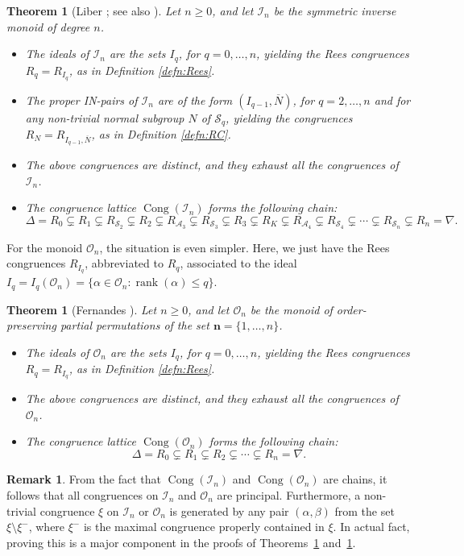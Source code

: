 \documentclass[11pt,a4paper]{article}
\renewcommand{\O}{\mathcal O}
\newcommand{\I}{\mathcal I}
\renewcommand{\S}{\mathcal S}
\newcommand{\A}{\mathcal A}
\newcommand{\bn}{\mathbf{n}}
\newcommand{\al}{\alpha}
\newcommand{\Cong}{\operatorname{Cong}}
\newcommand{\rank}{\operatorname{rank}}
\newcommand{\set}[2]{\{ {#1} : {#2} \}}
\newcommand{\1}{\id_n}
\newcommand{\suq}{\subsetneq}
\newcommand{\bit}{\begin{itemize}}
\newcommand{\eit}{\end{itemize}}
\newcommand{\itemit}[1]{\item[\emph{(#1)}]}
\newcommand{\epfreseq}{\tag*{\qed}}
\numberwithin{equation}{section}
\newtheorem{thm}[equation]{Theorem}
\theoremstyle{definition}
\newtheorem{rem}[equation]{Remark}
\begin{document}
\begin{itemize}
\begin{thm}[Liber \cite{Liber1953}; see also {\cite[Section 6.3]{GMbook}}]\label{thm:In}
Let $n\geq0$, and let $\I_n$ be the symmetric inverse monoid of degree $n$.  
\bit
\itemit{i} The ideals of $\I_n$ are the sets $I_q$, for $q=0,\ldots,n$, yielding the Rees congruences $R_q=R_{I_q}$, as in Definition \ref{defn:Rees}.
\itemit{ii} The proper IN-pairs of $\I_n$ are of the form $(I_{q-1},\overline N)$, for $q=2,\ldots,n$ and for any non-trivial normal subgroup $N$ of $\S_q$, yielding the congruences $R_N=R_{I_{q-1},\overline N}$, as in Definition \ref{defn:RC}.
\itemit{iii} The above congruences are distinct, and they exhaust all the congruences of $\I_n$.
\itemit{iv} The congruence lattice $\Cong(\I_n)$ forms the following chain:
\[
\epfreseq
\Delta=R_0 \suq R_1 \suq R_{\S_2} \suq R_2 \suq R_{\A_3} \suq R_{\S_3} \suq R_3 \suq R_K \suq R_{\A_4} \suq R_{\S_4}  \suq \cdots \suq R_{\S_n}\suq R_n = \nabla.
\]
\eit
\end{thm}



For the monoid $\O_n$, the situation is even simpler.  Here, we just have the Rees congruences $R_{I_q}$, abbreviated to $R_q$, associated to the ideal $I_q=I_q(\O_n)=\set{\al\in\O_n}{\rank(\al)\leq q}$. 



\begin{thm}[Fernandes \cite{Fernandes2001}]
\label{thm:On}
Let $n\geq0$, and let $\O_n$ be the monoid of order-preserving partial permutations of the set $\bn=\{1,\ldots,n\}$.  
\bit
\itemit{i} The ideals of $\O_n$ are the sets $I_q$, for $q=0,\ldots,n$, yielding the Rees congruences $R_q=R_{I_q}$, as in Definition \ref{defn:Rees}.
\itemit{ii} The above congruences are distinct, and they exhaust all the congruences of $\O_n$.
\itemit{iii} The congruence lattice $\Cong(\O_n)$ forms the following chain:
\[
\epfreseq
\Delta = R_0 \suq R_1 \suq R_2 \suq\cdots\suq R_n = \nabla.
\]
\eit
\end{thm}


\begin{rem}
\label{rem:InOnPrinc}
  From the fact that $\Cong(\I_n)$ and $\Cong(\O_n)$ are chains, it follows
  that all congruences on $\I_n$ and $\O_n$ are principal.  Furthermore, a non-trivial
  congruence $\xi$ on $\I_n$ or $\O_n$ is generated by any pair $(\alpha,\beta)$ from the set
  $\xi\setminus\xi^-$, where $\xi^-$ is the maximal congruence properly contained in
  $\xi$.  In actual fact, proving this is a major component in the proofs of
  Theorems~\ref{thm:In} and~\ref{thm:On}.
\end{rem}





\end{itemize}
\end{document}
